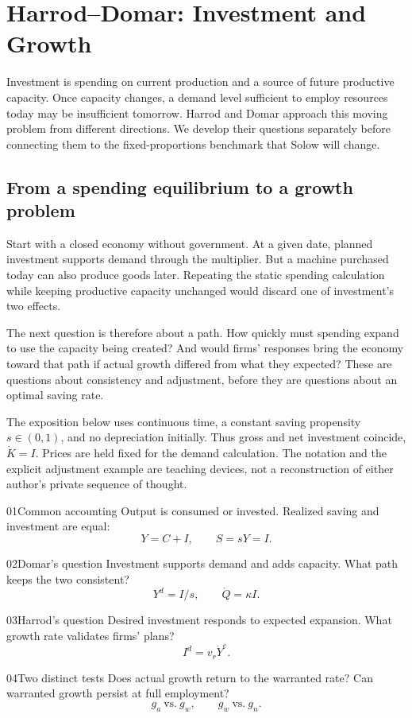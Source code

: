 \section{Harrod--Domar: Investment and Growth}\label{sec:harrod-domar}

Investment is spending on current production and a source of future productive
capacity. Once capacity changes, a demand level sufficient to employ resources
today may be insufficient tomorrow. Harrod and Domar approach this moving
problem from different directions. We develop their questions separately before
connecting them to the fixed-proportions benchmark that Solow will change.

\subsection{From a spending equilibrium to a growth problem}

Start with a closed economy without government. At a given date, planned
investment supports demand through the multiplier. But a machine purchased
today can also produce goods later. Repeating the static spending calculation
while keeping productive capacity unchanged would discard one of investment's
two effects.

The next question is therefore about a path. How quickly must spending expand
to use the capacity being created? And would firms' responses bring the economy
toward that path if actual growth differed from what they expected? These are
questions about consistency and adjustment, before they are questions about an
optimal saving rate.

The exposition below uses continuous time, a constant saving propensity
$s\in(0,1)$, and no depreciation initially. Thus gross and net investment
coincide, $\dot K=I$. Prices are held fixed for the demand calculation. The
notation and the explicit adjustment example are teaching devices, not a
reconstruction of either author's private sequence of thought.

\begin{modelsetup}
\begin{modelcondition}{01}{Common accounting}
Output is consumed or invested. Realized saving and investment are equal:
\[
Y=C+I,\qquad S=sY=I.
\]
\end{modelcondition}
\begin{modelcondition}{02}{Domar's question}
Investment supports demand and adds capacity. What path keeps the two
consistent?
\[
Y^d=I/s,\qquad \dot Q=\kappa I.
\]
\end{modelcondition}
\begin{modelcondition}{03}{Harrod's question}
Desired investment responds to expected expansion. What growth rate validates
firms' plans?
\[
I^d=v_r\dot Y^e.
\]
\end{modelcondition}
\begin{modelcondition}{04}{Two distinct tests}
Does actual growth return to the warranted rate? Can warranted growth persist
at full employment?
\[
g_a\ \text{vs.}\ g_w,\qquad g_w\ \text{vs.}\ g_n.
\]
\end{modelcondition}
\end{modelsetup}


